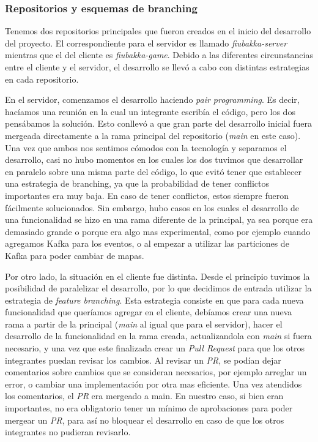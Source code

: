 \subsubsection{Repositorios y esquemas de branching}

\noindent Tenemos dos repositorios principales que fueron creados en el inicio del desarrollo del proyecto.
El correspondiente para el servidor es llamado \textit{fiubakka-server} mientras que el del cliente es \textit{fiubakka-game}.
Debido a las diferentes circunstancias entre el cliente y el servidor, el desarrollo se llevó a cabo con distintas estrategias
en cada repositorio.

En el servidor, comenzamos el desarrollo haciendo \textit{pair programming}. Es decir, hacíamos una reunión en la cual un integrante
escribía el código, pero los dos pensábamos la solución. Esto conllevó a que gran parte del desarrollo inicial fuera mergeada directamente
a la rama principal del repositorio (\textit{main} en este caso). Una vez que ambos nos sentimos cómodos con la tecnología y separamos el 
desarrollo, casi no hubo momentos en los cuales los dos tuvimos que desarrollar en paralelo sobre una misma parte del código, lo que evitó tener
que establecer una estrategia de branching, ya que la probabilidad de tener conflictos importantes era muy baja. En caso de tener conflictos, 
estos siempre fueron fácilmente solucionados.
Sin embargo, hubo casos en los cuales el desarrollo de una funcionalidad se hizo en una rama diferente de la principal, ya sea porque era demasiado
grande o porque era algo mas experimental, como por ejemplo cuando agregamos Kafka para los eventos, o al empezar a utilizar las particiones de Kafka
para poder cambiar de mapas.

Por otro lado, la situación en el cliente fue distinta. Desde el principio tuvimos la posibilidad de paralelizar el desarrollo, por lo que 
decidimos de entrada utilizar la estrategia de \textit{feature branching}. Esta estrategia consiste en que para cada nueva funcionalidad
que queríamos agregar en el cliente, debíamos crear una nueva rama a partir de la principal (\textit{main} al igual que para el servidor),
hacer el desarrollo de la funcionalidad en la rama creada, actualizandola con \textit{main} si fuera necesario, y una vez que este finalizada
crear un \textit{Pull Request} para que los otros integrantes puedan revisar los cambios. Al revisar un \textit{PR}, se podían dejar comentarios
sobre cambios que se consideran necesarios, por ejemplo arreglar un error, o cambiar una implementación por otra mas eficiente. Una vez atendidos
los comentarios, el \textit{PR} era mergeado a main. En nuestro caso, si bien eran importantes, no era obligatorio tener un mínimo de aprobaciones para poder mergear un \textit{PR},
para así no bloquear el desarrollo en caso de que los otros integrantes no pudieran revisarlo.


